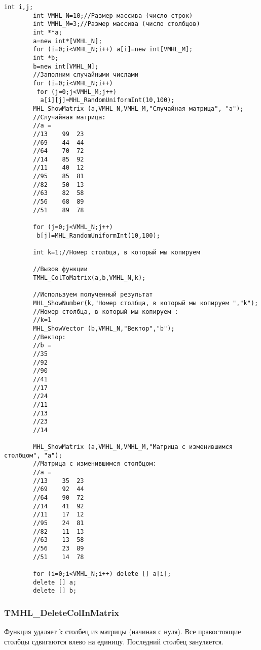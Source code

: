 \documentclass[a4paper,12pt]{article}
\begin{document}
\begin{lstlisting}[label=code_use_TMHL_ColToMatrix,caption=Пример использования]
        int i,j;
        int VMHL_N=10;//Размер массива (число строк)
        int VMHL_M=3;//Размер массива (число столбцов)
        int **a;
        a=new int*[VMHL_N];
        for (i=0;i<VMHL_N;i++) a[i]=new int[VMHL_M];
        int *b;
        b=new int[VMHL_N];
        //Заполним случайными числами
        for (i=0;i<VMHL_N;i++)
         for (j=0;j<VMHL_M;j++)
          a[i][j]=MHL_RandomUniformInt(10,100);
        MHL_ShowMatrix (a,VMHL_N,VMHL_M,"Случайная матрица", "a");
        //Случайная матрица:
        //a =
        //13	99	23
        //69	44	44
        //64	70	72
        //14	85	92
        //11	40	12
        //95	85	81
        //82	50	13
        //63	82	58
        //56	68	89
        //51	89	78

        for (j=0;j<VMHL_N;j++)
         b[j]=MHL_RandomUniformInt(10,100);

        int k=1;//Номер столбца, в который мы копируем

        //Вызов функции
        TMHL_ColToMatrix(a,b,VMHL_N,k);

        //Используем полученный результат
        MHL_ShowNumber(k,"Номер столбца, в который мы копируем ","k");
        //Номер столбца, в который мы копируем :
        //k=1
        MHL_ShowVector (b,VMHL_N,"Вектор","b");
        //Вектор:
        //b =
        //35
        //92
        //90
        //41
        //17
        //24
        //11
        //13
        //23
        //14

        MHL_ShowMatrix (a,VMHL_N,VMHL_M,"Матрица с изменившимся столбцом", "a");
        //Матрица с изменившимся столбцом:
        //a =
        //13	35	23
        //69	92	44
        //64	90	72
        //14	41	92
        //11	17	12
        //95	24	81
        //82	11	13
        //63	13	58
        //56	23	89
        //51	14	78

        for (i=0;i<VMHL_N;i++) delete [] a[i];
        delete [] a;
        delete [] b;
\end{lstlisting}

\subsubsection{TMHL\_DeleteColInMatrix}\label{TMHL_DeleteColInMatrix}

Функция удаляет k столбец из матрицы (начиная с нуля). Все правостоящие столбцы сдвигаются влево  на единицу. Последний столбец зануляется.
\end{document}

